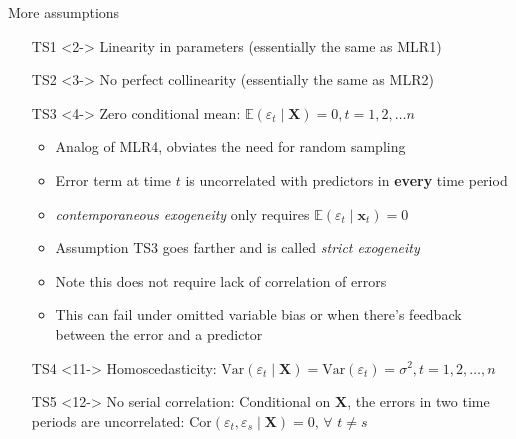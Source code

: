 \documentclass[
  ignorenonframetext,
]{beamer}
\begin{document}
\begin{frame}{More assumptions}
\protect\hypertarget{more-assumptions}{}
\begin{itemize}
    \setlength{\itemsep}{3pt}\setlength{\parskip}{3pt}
    \item[TS1]<2-> Linearity in parameters (essentially the same as MLR1)
    \item[TS2]<3-> No perfect collinearity (essentially the same as MLR2)
    \item[TS3]<4-> Zero conditional mean: $\mathbb{E}\left(\varepsilon_t\mid\mathbf{X}\right) = 0, t = 1, 2, \dots n$
    \begin{itemize}
        \setlength{\itemsep}{3pt}\setlength{\parskip}{3pt}
        \item<5-> Analog of MLR4, obviates the need for random sampling
        \item<6-> Error term at time $t$ is uncorrelated with predictors in \textbf{every} time period
        \item<7-> \textit{contemporaneous exogeneity} only requires $\mathbb{E}\left(\varepsilon_t\mid\mathbf{x}_t\right) = 0$
        \item<8-> Assumption TS3 goes farther and is called \textit{strict exogeneity}
        \item<9-> Note this does not require lack of correlation of errors
        \item<10-> This can fail under omitted variable bias or when there's feedback between the error and a predictor
    \end{itemize}
    \item[TS4]<11-> Homoscedasticity: $\text{Var}\left(\varepsilon_t\mid\mathbf{X}\right) = \text{Var}\left(\varepsilon_t\right) = \sigma^2, t = 1, 2, \dots, n$
    \item[TS5]<12-> No serial correlation: Conditional on $\mathbf{X}$, the errors in two time periods are uncorrelated: $\text{Cor}\left(\varepsilon_t,\varepsilon_s\mid\mathbf{X}\right) = 0,\,\forall\,\, t \neq s$
\end{itemize}
\end{frame}
\end{document}
